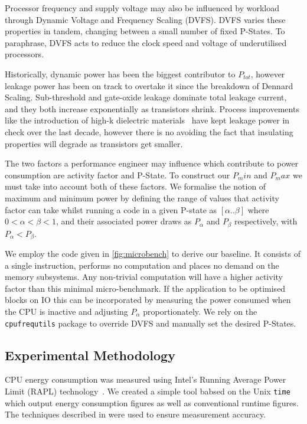 Processor frequency and supply voltage may also be influenced by workload through Dynamic Voltage and Frequency Scaling (DVFS).
DVFS varies these properties in tandem, changing between a small number of fixed P-States.
To paraphrase, DVFS acts to reduce the clock speed and voltage of underutilised processors.

Historically, dynamic power has been the biggest contributor to $P_{tot}$, however leakage power has been on track to overtake it since the breakdown of Dennard Scaling.  Sub-threshold and gate-oxide leakage dominate total leakage current, and they both increase exponentially as transistors shrink. Process improvements like the introduction of high-k dielectric materials~\cite{jan:2009aa} have kept leakage power in check over the last decade, however there is no avoiding the fact that insulating properties will degrade as transistors get smaller.

The two factors a performance engineer may influence which contribute to power consumption are activity factor and P-State.
To construct our $P_min$ and $P_max$ we must take into account both of these factors.
We formalise the notion of maximum and minimum power by defining the range of values that activity factor can take whilst running a code in a given P-state as $[\alpha  .. \beta]$ where $0 < \alpha < \beta < 1$, and their associated power draws as $P_{\alpha}$ and $P_{\beta}$ respectively, with $P_{\alpha} < P_{\beta}$.

We employ the code given in \autoref{fig:microbench} to derive our baseline.  It consists of a single instruction, performs no computation and places no demand on the memory subsystems. Any non-trivial computation will have a higher activity factor than this minimal micro-benchmark. If the application to be optimised blocks on IO this can be incorporated by measuring the power consumed when the CPU is inactive and adjusting $P_\alpha$ proportionately. We rely on the \texttt{cpufrequtils} package to override DVFS and manually set the desired P-States.


\subsection{Experimental Methodology}
CPU energy consumption was measured using Intel's Running Average Power Limit (RAPL) technology~\cite{david:2010aa}.
We created a simple tool babsed on the Unix \texttt{time} which output energy consumption figures as well as conventional runtime figures.
The techniques described in \cite{hackenberg:2013aa} were used to ensure measurement accuracy. 

